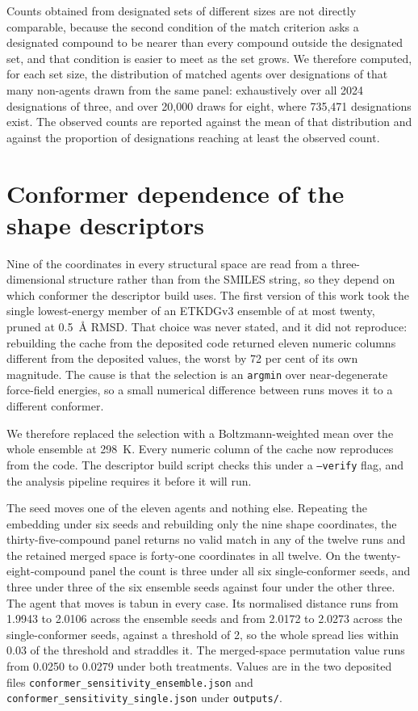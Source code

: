 \documentclass[11pt,a4paper]{article}
\begin{document}
Counts obtained from designated sets of different sizes are not directly
comparable, because the second condition of the match criterion asks a
designated compound to be nearer than every compound outside the designated
set, and that condition is easier to meet as the set grows. We therefore
computed, for each set size, the distribution of matched agents over
designations of that many non-agents drawn from the same panel: exhaustively
over all 2024 designations of three, and over 20,000 draws for eight, where
735,471 designations exist. The observed counts are reported against the mean
of that distribution and against the proportion of designations reaching at
least the observed count.


\section{Conformer dependence of the shape descriptors}
\label{meth:conformer}

Nine of the coordinates in every structural space are read from a
three-dimensional structure rather than from the SMILES string, so they depend
on which conformer the descriptor build uses. The first version of this work
took the single lowest-energy member of an ETKDGv3 ensemble of at most twenty,
pruned at 0.5~\AA{} RMSD. That choice was never stated, and it did not
reproduce: rebuilding the cache from the deposited code returned eleven numeric
columns different from the deposited values, the worst by 72
per cent of its own magnitude. The cause is that the selection is an
\texttt{argmin} over near-degenerate force-field energies, so a small numerical
difference between runs moves it to a different conformer.

We therefore replaced the selection with a Boltzmann-weighted mean over the
whole ensemble at 298~K. Every numeric column of the cache now reproduces from
the code. The descriptor build script checks this under a
\texttt{--verify} flag, and the analysis pipeline requires it before it will
run.

The seed moves one of the eleven agents and nothing else. Repeating the
embedding under six seeds and rebuilding only the nine shape coordinates, the
thirty-five-compound panel returns no valid match in any of the twelve runs and
the retained merged space is forty-one coordinates in all twelve. On the
twenty-eight-compound panel the count is three under all six single-conformer
seeds, and three under three of the six ensemble seeds against four under the
other three. The agent that moves is tabun in every case. Its normalised
distance runs from 1.9943 to 2.0106 across the ensemble seeds and from 2.0172 to
2.0273 across the single-conformer seeds, against a threshold of 2, so the whole
spread lies within 0.03 of the threshold and straddles it. The merged-space
permutation value runs from 0.0250 to 0.0279 under both treatments. Values are
in the two deposited files
\texttt{conformer\_sensitivity\_ensemble.json} and
\texttt{conformer\_sensitivity\_single.json} under \texttt{outputs/}.
\end{document}
